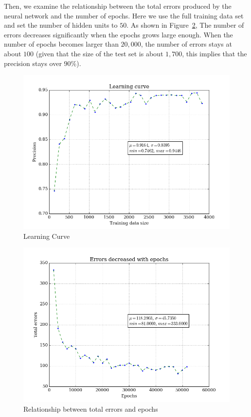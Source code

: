 \documentclass{article}
\begin{document}
Then, we examine the relationship between the total errors produced by the neural network and the number of epochs. Here we use the full training data set and set the number of hidden units to $50$. As shown in Figure~\ref{fig:error}, The number of errors decreases significantly when the epochs grows large enough. When the number of epochs becomes larger than $20, 000$, the number of errors stays at about $100$ (given that the size of the test set is about $1,700$, this implies that the precision stays over $90\%$).

\begin{figure}[H]
\centering
\includegraphics[width=400pt]{../asset/learning-curve.png}
\caption{Learning Curve}
\label{fig:curve}
\end{figure}

\begin{figure}[H]
\centering
\includegraphics[width=400pt]{../asset/error-curve.png}
\caption{Relationship between total errors and epochs}
\label{fig:error}
\end{figure}
\end{document}
